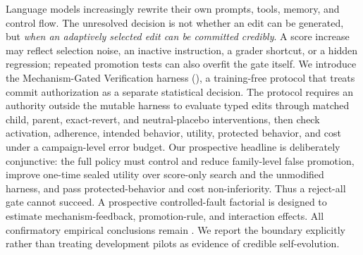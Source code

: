 Language models increasingly rewrite their own prompts, tools, memory, and
control flow.  The unresolved decision is not whether an edit can be generated,
but \emph{when an adaptively selected edit can be committed credibly}.  A score
increase may reflect selection noise, an inactive instruction, a grader
shortcut, or a hidden regression; repeated promotion tests can also overfit the
gate itself.  We introduce the Mechanism-Gated Verification harness
(\systemname), a training-free protocol that treats commit authorization as a
separate statistical decision.  The protocol requires
an authority outside the mutable harness to evaluate typed edits through matched
child, parent, exact-revert, and neutral-placebo interventions, then check
activation, adherence, intended behavior, utility, protected behavior, and cost
under a campaign-level error budget.  Our prospective headline is deliberately conjunctive: the full
policy must control and reduce family-level false promotion, improve one-time
sealed utility over score-only search and the unmodified harness, and pass
protected-behavior and cost non-inferiority.  Thus a reject-all gate cannot
succeed.  A prospective controlled-fault factorial is designed to estimate
mechanism-feedback, promotion-rule, and interaction effects.  All confirmatory
empirical conclusions remain
.  We report the boundary explicitly rather than treating
development pilots as evidence of credible self-evolution.
